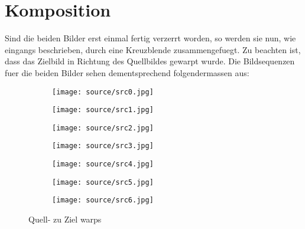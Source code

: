 \chapter{Komposition}

Sind die beiden Bilder erst einmal fertig verzerrt worden, so werden
sie nun, wie eingangs beschrieben, durch eine Kreuzblende 
zusammengefuegt. Zu beachten ist, dass das Zielbild
in Richtung des Quellbildes gewarpt wurde. Die Bildsequenzen
fuer die beiden Bilder sehen dementsprechend folgendermassen
aus:

\begin{figure}[htbp]
	\centering
	\begin{subfigure}[b]{0.12\textwidth}
		\centering
		\texttt{[image: source/src0.jpg]} %
		\caption{}
	\end{subfigure}
		\begin{subfigure}[b]{0.12\textwidth}
		\centering
		\texttt{[image: source/src1.jpg]} %
		\caption{}
	\end{subfigure}
		\begin{subfigure}[b]{0.12\textwidth}
		\centering
		\texttt{[image: source/src2.jpg]} %
		\caption{}
	\end{subfigure}
		\begin{subfigure}[b]{0.12\textwidth}
		\centering
		\texttt{[image: source/src3.jpg]} %
		\caption{}
	\end{subfigure}
		\begin{subfigure}[b]{0.12\textwidth}
		\centering
		\texttt{[image: source/src4.jpg]} %
		\caption{}
	\end{subfigure}
		\begin{subfigure}[b]{0.12\textwidth}
		\centering
		\texttt{[image: source/src5.jpg]} %
		\caption{}
	\end{subfigure}
			\begin{subfigure}[b]{0.12\textwidth}
		\centering
		\texttt{[image: source/src6.jpg]} %
		\caption{}
	\end{subfigure}
		\caption{Quell- zu Ziel warps}
	\label{fig:sources}
	\end{figure}
	
